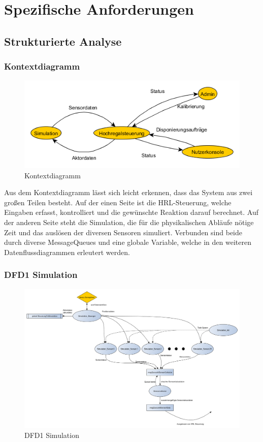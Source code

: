 \section{Spezifische Anforderungen}
\subsection{Strukturierte Analyse}
\subsubsection{Kontextdiagramm}
\begin{figure}[H]
	\centering
  \includegraphics[width=\textwidth]{DFD/kontextdiagramm.png}
	\caption{Kontextdiagramm}
	\label{fig1}
\end{figure}
Aus dem Kontextdiagramm lässt sich leicht erkennen, dass das System aus zwei großen Teilen besteht. Auf der einen Seite ist die HRL-Steuerung, welche Eingaben erfasst, kontrolliert und die gewünschte Reaktion darauf berechnet. Auf der anderen Seite steht die Simulation, die für die physikalischen Abläufe nötige Zeit und das auslösen der diversen Sensoren simuliert. Verbunden sind beide durch diverse MessageQueues und eine globale Variable, welche in den weiteren Datenflussdiagrammen erleutert werden.
\subsubsection{DFD1 Simulation}
\begin{figure}[H]
	\centering
  \includegraphics[width=\textwidth]{DFD/dfd1_simulation1_1.png}
	\caption{DFD1 Simulation}
	\label{fig2}
\end{figure}



